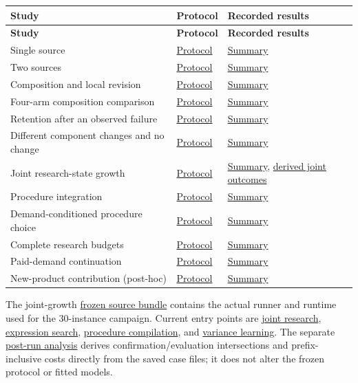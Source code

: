 \documentclass[twoside,11pt]{article}
\begin{document}
\begingroup\small\setlength{\tabcolsep}{4pt}
\renewcommand{\arraystretch}{1.18}
\begin{longtable}{@{}>{\raggedright\arraybackslash}p{}>{\raggedright\arraybackslash}p{}>{\raggedright\arraybackslash}p{}@{}}
\toprule
\textbf{Study} & \textbf{Protocol} & \textbf{Recorded results} \\
\midrule\endfirsthead
\toprule
\textbf{Study} & \textbf{Protocol} & \textbf{Recorded results} \\
\midrule\endhead
\bottomrule\endlastfoot
Single source & \hyperlink{artifact-11}{Protocol} & \hyperlink{artifact-12}{Summary} \\
Two sources & \hyperlink{artifact-13}{Protocol} & \hyperlink{artifact-14}{Summary} \\
Composition and local revision & \hyperlink{artifact-15}{Protocol} & \hyperlink{artifact-16}{Summary} \\
Four-arm composition comparison & \hyperlink{artifact-17}{Protocol} & \hyperlink{artifact-18}{Summary} \\
Retention after an observed failure & \hyperlink{artifact-19}{Protocol} & \hyperlink{artifact-20}{Summary} \\
Different component changes and no change & \hyperlink{artifact-21}{Protocol} & \hyperlink{artifact-22}{Summary} \\
Joint research-state growth & \hyperlink{artifact-23}{Protocol} & \hyperlink{artifact-24}{Summary}, \hyperlink{artifact-25}{derived joint outcomes} \\
Procedure integration & \hyperlink{artifact-26}{Protocol} & \hyperlink{artifact-27}{Summary} \\
Demand-conditioned procedure choice & \hyperlink{artifact-28}{Protocol} & \hyperlink{artifact-29}{Summary} \\
Complete research budgets & \hyperlink{artifact-30}{Protocol} & \hyperlink{artifact-31}{Summary} \\
Paid-demand continuation & \hyperlink{artifact-32}{Protocol} & \hyperlink{artifact-33}{Summary} \\
New-product contribution (post-hoc) & \hyperlink{artifact-34}{Protocol} & \hyperlink{artifact-35}{Summary} \\
\end{longtable}
\endgroup

The joint-growth \hyperlink{artifact-36}{frozen source bundle}
contains the actual runner and runtime used for the 30-instance campaign. Current
entry points are \hyperlink{artifact-37}{joint research},
\hyperlink{artifact-38}{expression search},
\hyperlink{artifact-39}{procedure compilation}, and
\hyperlink{artifact-40}{variance learning}.
The separate \hyperlink{artifact-41}{post-run analysis} derives
confirmation/evaluation intersections and prefix-inclusive costs directly from
the saved case files; it does not alter the frozen protocol or fitted models.
\end{document}
